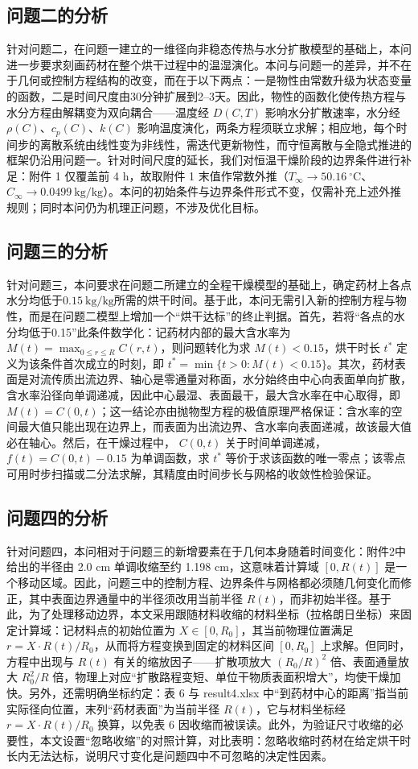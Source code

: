 \documentclass[12pt,a4paper]{article}
\begin{document}
\subsection{问题二的分析}
针对问题二，在问题一建立的一维径向非稳态传热与水分扩散模型的基础上，本问进一步要求刻画药材在整个烘干过程中的温湿演化。本问与问题一的差异，并不在于几何或控制方程结构的改变，而在于以下两点：一是物性由常数升级为状态变量的函数，二是时间尺度由30分钟扩展到2--3天。因此，物性的函数化使传热方程与水分方程由解耦变为双向耦合——温度经 $D(C,T)$ 影响水分扩散速率，水分经 $\rho(C)$、$c_p(C)$、$k(C)$ 影响温度演化，两条方程须联立求解；相应地，每个时间步的离散系统由线性变为非线性，需迭代更新物性，而守恒离散与全隐式推进的框架仍沿用问题一。针对时间尺度的延长，我们对恒温干燥阶段的边界条件进行补足：附件 1 仅覆盖前 4 h，故取附件 1 末值作常数外推（$T_\infty\rightarrow50.16\ ^\circ\text{C}$、$C_\infty\rightarrow0.0499\ \text{kg/kg}$）。本问的初始条件与边界条件形式不变，仅需补充上述外推规则；同时本问仍为机理正问题，不涉及优化目标。

\subsection{问题三的分析}
针对问题三，本问要求在问题二所建立的全程干燥模型的基础上，确定药材上各点水分均低于$0.15\ \text{kg/kg}$所需的烘干时间。基于此，本问无需引入新的控制方程与物性，而是在问题二模型上增加一个“烘干达标”的终止判据。首先，若将“各点的水分均低于0.15”此条件数学化：记药材内部的最大含水率为 $M(t)=\max_{0\leq r\leq R} C(r,t)$，则问题转化为求 $M(t)<0.15$，烘干时长 $t^*$ 定义为该条件首次成立的时刻，即 $t^*=\min\{t>0: M(t)<0.15\}$。其次，药材表面是对流传质出流边界、轴心是零通量对称面，水分始终由中心向表面单向扩散，含水率沿径向单调递减，因此中心最湿、表面最干，最大含水率在中心取得，即 $M(t)=C(0,t)$；这一结论亦由抛物型方程的极值原理严格保证：含水率的空间最大值只能出现在边界上，而表面为出流边界、含水率向表面递减，故该最大值必在轴心。然后，在干燥过程中， $C(0,t)$ 关于时间单调递减，$f(t)=C(0,t)-0.15$ 为单调函数，求 $t^*$ 等价于求该函数的唯一零点；该零点可用时步扫描或二分法求解，其精度由时间步长与网格的收敛性检验保证。

\subsection{问题四的分析}
针对问题四，本问相对于问题三的新增要素在于几何本身随着时间变化：附件2中给出的半径由 2.0 cm 单调收缩至约 1.198 cm，这意味着计算域 $[0,R(t)]$ 是一个移动区域。因此，问题三中的控制方程、边界条件与网格都必须随几何变化而修正，其中表面边界通量中的半径须改用当前半径 $R(t)$，而非初始半径。基于此，为了处理移动边界，本文采用跟随材料收缩的材料坐标（拉格朗日坐标）来固定计算域：记材料点的初始位置为 $X\in[0,R_0]$，其当前物理位置满足 $r=X\cdot R(t)/R_0$，从而将方程变换到固定的材料区间 $[0,R_0]$ 上求解。但同时，方程中出现与 $R(t)$ 有关的缩放因子——扩散项放大 $(R_0/R)^2$ 倍、表面通量放大 $R_0^2/R$ 倍，物理上对应“扩散路程变短、单位干物质表面积增大”，均使干燥加快。另外，还需明确坐标约定：表 6 与 result4.xlsx 中“到药材中心的距离”指当前实际径向位置，末列“药材表面”为当前半径 $R(t)$，它与材料坐标经 $r=X\cdot R(t)/R_0$ 换算，以免表 6 因收缩而被误读。此外，为验证尺寸收缩的必要性，本文设置“忽略收缩”的对照计算，对比表明：忽略收缩时药材在给定烘干时长内无法达标，说明尺寸变化是问题四中不可忽略的决定性因素。
\end{document}
